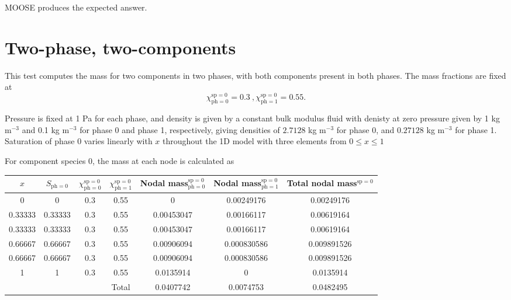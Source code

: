 \documentclass[]{scrreprt}
\def\species{\mathrm{sp}}
\def\phase{\mathrm{ph}}
\def\massfrac{\chi}
\begin{document}
MOOSE produces the expected answer.

\newpage

\section{Two-phase, two-components}

This test computes the mass for two components in two phases, with both components present in
both phases. The mass fractions are fixed at
\begin{equation}
\massfrac_{\phase=0}^{\species=0} = 0.3 \ , \massfrac_{\phase=1}^{\species=0} = 0.55 .
\end{equation}

Pressure is fixed at 1 Pa for each phase, and density is given by a constant bulk modulus fluid with denisty
at zero pressure given by 1 kg m$^{-3}$ and 0.1 kg m$^{-3}$ for phase 0 and phase 1, respectively, giving densities of $2.7128$
kg m$^{-3}$ for phase 0, and $0.27128$ kg m$^{-3}$ for phase 1. Saturation of phase 0 varies linearly
with $x$ throughout the 1D model with three elements from $ 0 \le x \le 1$

For component species 0, the mass at each node is calculated as
\begin{center}
\begin{tabular}{|ccccccc|}
\hline
$x$ & $S_{\phase=0}$ & $\massfrac_{\phase=0}^{\species=0}$ & $\massfrac_{\phase=1}^{\species=0}$
& Nodal mass$_{\phase=0}^{\species=0}$ & Nodal mass$_{\phase=1}^{\species=0}$ & Total nodal mass$^{\species=0}$ \\
\hline
0 & 0 & 0.3 & 0.55 & 0 & 0.00249176 & 0.00249176 \\
0.33333 & 0.33333 & 0.3 & 0.55 & 0.00453047 & 0.00166117 & 0.00619164 \\
0.33333 & 0.33333 & 0.3 & 0.55 & 0.00453047 & 0.00166117 & 0.00619164 \\
0.66667 & 0.66667 & 0.3 & 0.55 & 0.00906094 & 0.000830586 & 0.009891526 \\
0.66667 & 0.66667 & 0.3 & 0.55 & 0.00906094 & 0.000830586 & 0.009891526 \\
1 & 1 & 0.3 & 0.55 & 0.0135914 & 0 & 0.0135914 \\
\hline
 & & & Total & 0.0407742 & 0.0074753 & 0.0482495 \\
\hline
\end{tabular}
\end{center}
\end{document}
